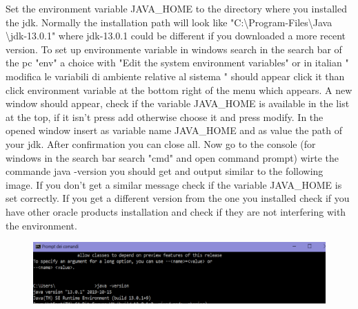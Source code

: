 Set the environment variable JAVA\_HOME to the directory where you installed the jdk.
Normally the installation path will look like "C:\textbackslash Program-Files\textbackslash Java \textbackslash jdk-13.0.1" where jdk-13.0.1 could be different if you downloaded a more recent version. To set up environmente variable in windows search in the search bar of the pc "env" a choice with 
"Edit the system environment variables" or in italian " modifica le variabili di ambiente relative al sistema " should appear  
click it than click environment variable at the bottom right of the menu which appears. A new window should appear, check if the variable JAVA\_HOME is available in the list at the top, if it isn't  press add otherwise choose it and press modify. In the opened window insert as variable name JAVA\_HOME and as value the path of your jdk. After confirmation you can close all.
Now go to the console (for windows in the search bar search "cmd" and open command prompt) wirte the commande java -version
you should get and output similar to the following image.
If you don't get a similar message check if the variable JAVA\_HOME is set correctly. If you get a different version from the one you installed check if you have other oracle products installation and check if they are not interfering with the environment.
\begin{figure}[h]
\centering
\includegraphics[width=\textwidth]{Images/javaInstallationCheck.png}
\end{figure} 

\clearpage
